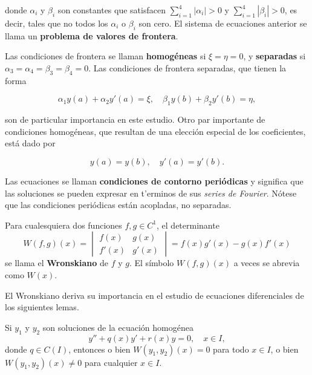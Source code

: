 \documentclass[main.tex]{subfiles}
\begin{document}
donde \( \alpha_i \) y \( \beta_i \) son constantes que satisfacen \( \sum_{i=1}^4 |\alpha_i| > 0 \) y \( \sum_{i=1}^4 |\beta_i| > 0 \), es decir, tales que no todos los \( \alpha_i \) o \( \beta_i \) son cero. El sistema de ecuaciones anterior se llama un \textbf{problema de valores de frontera}.

Las condiciones de frontera se llaman \textbf{homogéneas} si \( \xi = \eta = 0 \), y \textbf{separadas} si \( \alpha_3 = \alpha_4 = \beta_3 = \beta_4 = 0 \). Las condiciones de frontera separadas, que tienen la forma

\[
\alpha_1 y(a) + \alpha_2 y'(a) = \xi, \quad \beta_1 y(b) + \beta_2 y'(b) = \eta,
\]

son de particular importancia en este estudio. Otro par importante de condiciones homogéneas, que resultan de una elección especial de los coeficientes, está dado por

\[
y(a) = y(b), \quad y'(a) = y'(b).
\]

Las ecuaciones se llaman \textbf{condiciones de contorno periódicas} y significa que las soluciones se pueden expresar en t'erminos de sus \emph{series de Fourier}. Nótese que las condiciones periódicas están acopladas, no separadas.
\begin{def.}[Wronskiano]
Para cualesquiera dos funciones \( f, g \in C^1 \), el determinante
\[
W(f, g)(x) = \begin{vmatrix}
f(x) & g(x) \\
f'(x) & g'(x)
\end{vmatrix} = f(x)g'(x) - g(x)f'(x)
\]
se llama el \textbf{Wronskiano} de \( f \) y \( g \). El símbolo \( W(f, g)(x) \) a veces se abrevia como \( W(x) \).
\end{def.}

El Wronskiano deriva su importancia en el estudio de ecuaciones diferenciales de los siguientes lemas.

\begin{lema}
Si \(y_1\) y \(y_2\) son soluciones de la ecuación homogénea
\[
y'' + q(x) y' + r(x) y = 0, \quad x \in I,
\]
donde \( q \in C(I) \), entonces o bien \( W(y_1, y_2)(x) = 0 \) para todo \( x \in I \), o bien \( W(y_1, y_2)(x) \neq 0 \) para cualquier \( x \in I \).
\end{lema}
\end{document}
